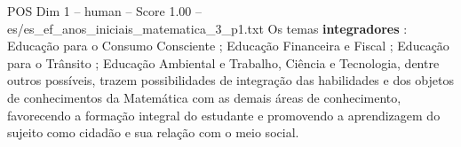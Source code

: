 \begin{textsample}{POS Dim 1 – human – Score 1.00 – es/es\_ef\_anos\_iniciais\_matematica\_3\_p1.txt}  \label{ex:f1_pos_014}
Os temas \textbf{integradores} : Educação para o Consumo Consciente ; Educação Financeira e Fiscal ; Educação para o Trânsito ; Educação Ambiental e Trabalho, Ciência e Tecnologia, dentre outros possíveis, trazem possibilidades de integração das habilidades e dos objetos de conhecimentos da Matemática com as demais áreas de conhecimento, favorecendo a formação integral do estudante e promovendo a aprendizagem do sujeito como cidadão e sua relação com o meio social.

\end{textsample}
